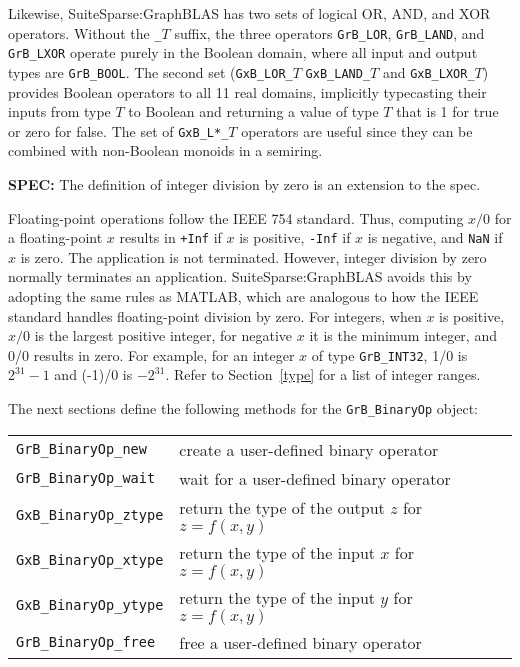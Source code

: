 \documentclass[12pt]{article}
\begin{document}
Likewise, SuiteSparse:GraphBLAS has two sets of logical OR, AND, and XOR
operators.  Without the \verb'_'$T$ suffix, the three operators \verb'GrB_LOR',
\verb'GrB_LAND', and \verb'GrB_LXOR' operate purely in the Boolean domain,
where all input and output types are \verb'GrB_BOOL'.  The second set
(\verb'GxB_LOR_'$T$ \verb'GxB_LAND_'$T$ and \verb'GxB_LXOR_'$T$) provides
Boolean operators to all 11 real domains, implicitly typecasting their inputs from
type $T$ to Boolean and returning a value of type $T$ that is 1 for true or
zero for false.  The set of \verb'GxB_L*_'$T$ operators are useful since they
can be combined with non-Boolean monoids in a semiring.

\begin{spec}
{\bf SPEC:} The definition of integer division by zero is an extension to the spec.
\end{spec}

Floating-point operations follow the IEEE 754 standard.  Thus, computing $x/0$
for a floating-point $x$ results in \verb'+Inf' if $x$ is positive, \verb'-Inf'
if $x$ is negative, and \verb'NaN' if $x$ is zero.  The application is not
terminated.  However, integer division by zero normally terminates an
application.  SuiteSparse:GraphBLAS avoids this by adopting the same rules as
MATLAB, which are analogous to how the IEEE standard handles floating-point
division by zero.  For integers, when $x$ is positive, $x/0$ is the largest
positive integer, for negative $x$ it is the minimum integer, and 0/0 results
in zero.  For example, for an integer $x$ of type \verb'GrB_INT32', 1/0 is
$2^{31}-1$ and (-1)/0 is $-2^{31}$.  Refer to Section~\ref{type} for a list of
integer ranges.

The next sections define the following methods for the \verb'GrB_BinaryOp'
object:

\vspace{0.2in}
{\footnotesize
\begin{tabular}{ll}
\hline
\verb'GrB_BinaryOp_new'   & create a user-defined binary operator \\
\verb'GrB_BinaryOp_wait'  & wait for a user-defined binary operator \\
\verb'GxB_BinaryOp_ztype' & return the type of the output $z$ for $z=f(x,y)$\\
\verb'GxB_BinaryOp_xtype' & return the type of the input $x$ for $z=f(x,y)$\\
\verb'GxB_BinaryOp_ytype' & return the type of the input $y$ for $z=f(x,y)$\\
\verb'GrB_BinaryOp_free'  & free a user-defined binary operator \\
\hline
\end{tabular}
}
\vspace{0.2in}
\end{document}
